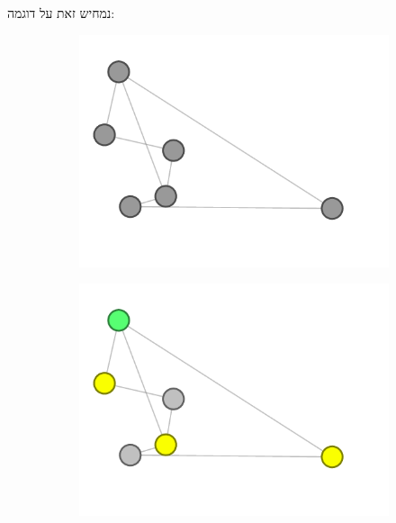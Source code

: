 \documentclass[12pt,twoside]{article}
\begin{document}
נמחיש זאת על דוגמה:
\begin{figure}[ht]
    \begin{subfigure}{.5\textwidth}
        \unsethebrew
        \caption{}
        \centering
        \includegraphics[width=\textwidth,height=\textheight,keepaspectratio]{images/graph_start_board.png}
        \sethebrew
    \end{subfigure}%
    \begin{subfigure}{.5\textwidth}
        \unsethebrew
        \caption{}
        \centering
        \includegraphics[width=\textwidth,height=\textheight,keepaspectratio]{images/graph_press.png}
        \sethebrew
    \end{subfigure}%
\end{figure}
\end{document}
